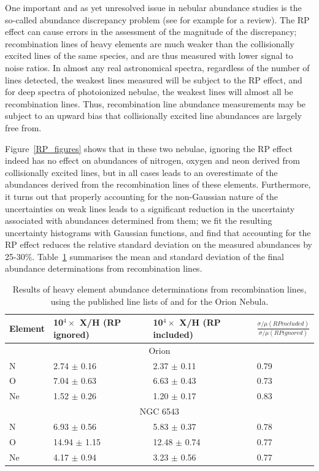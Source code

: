 \documentclass[useAMS,usenatbib]{mn2e}
\begin{document}
One important and as yet unresolved issue in nebular abundance studies is the so-called abundance discrepancy problem (see for example \citet{2006IAUS..234..219L} for a review).  The RP effect can cause errors in the assessment of the magnitude of the discrepancy; recombination lines of heavy elements are much weaker than the collisionally excited lines of the same species, and are thus measured with lower signal to noise ratios.  In almost any real astronomical spectra, regardless of the number of lines detected, the weakest lines measured will be subject to the RP effect, and for deep spectra of photoionized nebulae, the weakest lines will almost all be recombination lines.  Thus, recombination line abundance measurements may be subject to an upward bias that collisionally excited line abundances are largely free from.

Figure~\ref{RP_figures} shows that in these two nebulae, ignoring the RP effect indeed has no effect on abundances of nitrogen, oxygen and neon derived from collisionally excited lines, but in all cases leads to an overestimate of the abundances derived from the recombination lines of these elements.  Furthermore, it turns out that properly accounting for the non-Gaussian nature of the uncertainties on weak lines leads to a significant reduction in the uncertainty associated with abundances determined from them; we fit the resulting uncertainty histograms with Gaussian functions, and find that accounting for the RP effect reduces the relative standard deviation on the measured abundances by 25-30\%.  Table~\ref{RP_numbers} summarises the mean and standard deviation of the final abundance determinations from recombination lines.

\begin{table}
\begin{tabular}{l ll l}
\hline
Element & 10$^4 \times$ X/H (RP ignored) & 10$^4 \times$ X/H (RP included) & $\frac{\sigma/\mu (RP included)}{\sigma/\mu (RP ignored)}$ \\
\hline
\multicolumn{4}{c}{Orion}\\

N & 2.74 $\pm$ 0.16 & 2.37 $\pm$ 0.11 & 0.79 \\
O & 7.04 $\pm$ 0.63 & 6.63 $\pm$ 0.43 & 0.73 \\
Ne & 1.52 $\pm$ 0.26 & 1.20 $\pm$ 0.17 & 0.83 \\

\multicolumn{4}{c}{NGC 6543} \\

N & 6.93 $\pm$  0.56 & 5.83 $\pm$  0.37 & 0.78 \\
O & 14.94 $\pm$ 1.15 & 12.48 $\pm$ 0.74 & 0.77 \\
Ne & 4.17 $\pm$ 0.94 & 3.23 $\pm$ 0.56 & 0.77 \\
\hline
\end{tabular}
\caption{Results of heavy element abundance determinations from recombination lines, using the published line lists of \citet{2004MNRAS.351.1026W} and \citet{2004MNRAS.355..229E} for the Orion Nebula.}
\label{RP_numbers}
\end{table}
\end{document}
